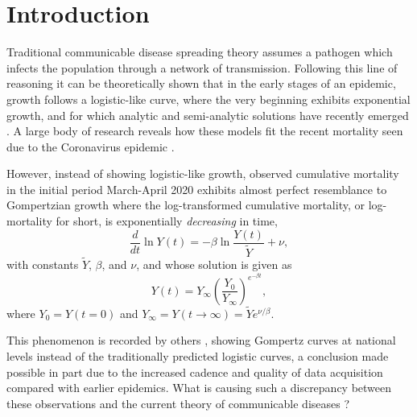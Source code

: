 \documentclass[sn-mathphys]{sn-jnl}%
\newcommand{\insertSmallPdfFig}[3]{
  \begin{figure}[h]
  \centering
  \texttt{[image: \#1.pdf]}
  \caption{#2}
  \label{fig:#1}
  \end{figure}
}
\theoremstyle{thmstyleone}%
\theoremstyle{thmstyletwo}%
\theoremstyle{thmstylethree}%
\begin{document}
\section{Introduction}\label{sec1}

Traditional communicable disease spreading theory assumes a pathogen which infects the population through a network of transmission. 
Following this line of reasoning it can be theoretically shown that in the early stages of an epidemic, growth follows a logistic-like curve, where the very beginning exhibits exponential growth, and for which analytic and semi-analytic solutions have recently emerged \cite{harko2014exact,kroger2020analytical,schlickeiser2021analytical,heng2020approximately}. 
A large body of research reveals how these models fit the recent mortality seen due to the Coronavirus epidemic \cite{carletti2020covid,cooper2020sir,postnikov2020estimation,munoz2021sir,cooper2022dynamical,saikia2021covid}. 

However, instead of showing logistic-like growth, observed cumulative mortality in the initial period March-April 2020 exhibits almost perfect resemblance to Gompertzian growth \cite{Gompertz1825,bajzer1997mathematical} where the log-transformed cumulative mortality, or log-mortality for short, is exponentially \emph{decreasing} in time,
\begin{equation}
\label{eq:GompertzODE}
\frac{d}{dt}\ln{Y(t)} = -\beta\ln{\frac{Y(t)}{\tilde{Y}}} + \nu,
\end{equation} 
with constants $\tilde{Y}$, $\beta$, and $\nu$, and whose solution is given as
\begin{equation}
\label{eq:gomp_solution}
Y(t) = Y_\infty \left(\frac{Y_0}{Y_\infty}\right)^{e^{-\beta t}},
\end{equation}
where $Y_{0}=Y(t = 0)$ and $Y_{\infty}=Y(t\rightarrow \infty)=\tilde{Y}e^{\nu/\beta}$.


This phenomenon is recorded by others \cite{Ohnishi2020,Rypdal2020,Catala2020,rodrigues2020monte,Levitt2020}, showing Gompertz curves at national levels instead of the traditionally predicted logistic curves, a conclusion made possible in part due to the increased cadence and quality of data acquisition compared with earlier epidemics. What is causing such a discrepancy between these observations and the current theory of communicable diseases \cite{castro2020turning}? 
\end{document}
